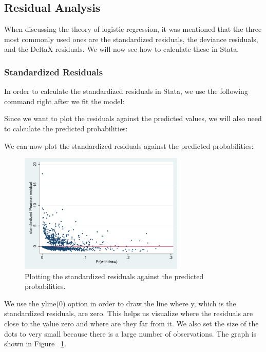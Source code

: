 \documentclass[a4paper,12pt,oneside]{book}
\begin{document}
\subsection{Residual Analysis}
When discussing the theory of logistic regression, it was mentioned that the three most commonly used ones are the standardized residuals, the deviance residuals, and the DeltaX residuals. 
We will now see how to calculate these in Stata.
\subsubsection{Standardized Residuals}
In order to calculate the standardized residuals in Stata, we use the following command right after we fit the model:

\begin{stlog}\end{stlog}

Since we want to plot the residuals against the predicted values, we will also need to calculate the predicted probabilities:

\begin{stlog}\end{stlog}

We can now plot the standardized residuals against the predicted probabilities:

\begin{stlog}\end{stlog}
\begin{figure}[h]
    \centering
    \includegraphics[width=0.7\textwidth]{book_44.pdf}
    \caption{Plotting the standardized residuals against the predicted probabilities.}
    \label{fig:res1}
\end{figure}

We use the yline(0) option in order to draw the line where y, which is the standardized residuals, are zero. This helps us visualize where the residuals are close to the value zero 
and where are they far from it. We also set the size of the dots to very small because there is a large number of observations. The graph is shown in Figure ~\ref{fig:res1}.
\end{document}
